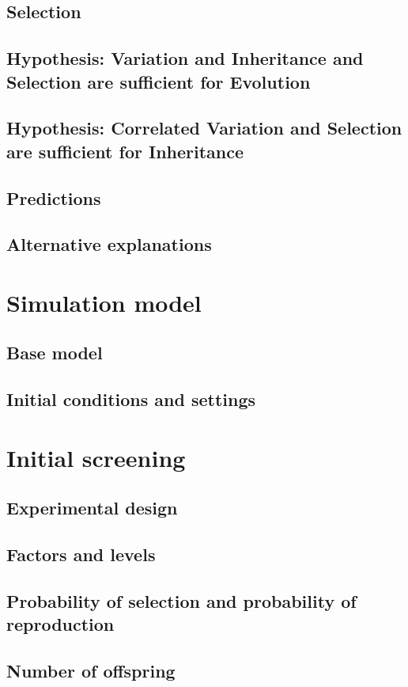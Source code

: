 \documentclass[]{report}
\begin{document}
\section{Selection}
\section{Hypothesis: Variation and Inheritance and Selection are sufficient for Evolution}
\section{Hypothesis: Correlated Variation and Selection are sufficient for Inheritance}
\section{Predictions}
\section{Alternative explanations}

\chapter{Simulation model}
\section{Base model}
\section{Initial conditions and settings}

\chapter{Initial screening}
\section{Experimental design}
\section{Factors and levels}
\section{Probability of selection and probability of reproduction}
\section{Number of offspring}
\end{document}
